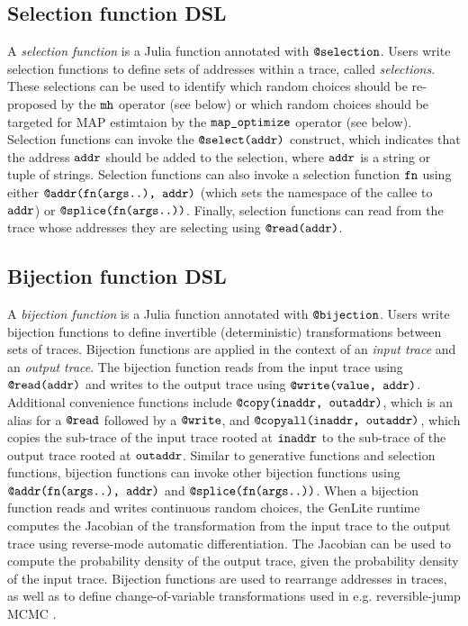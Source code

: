 \subsection{Selection function DSL}
A \emph{selection function} is a Julia function annotated with $\mbox{\texttt{@selection}}$.
Users write selection functions to define sets of addresses within a trace, called \emph{selections}.
These selections can be used to identify which random choices should be re-proposed by the $\mbox{\texttt{mh}}$ operator (see below) or which random choices should be targeted for MAP estimtaion by the $\mbox{\texttt{map\_optimize}}$ operator (see below).
Selection functions can invoke the $\mbox{\texttt{@select(addr)}}$ construct, which indicates that the address $\mbox{\texttt{addr}}$ should be added to the selection, where $\mbox{\texttt{addr}}$ is a string or tuple of strings.
Selection functions can also invoke a selection function $\mbox{\texttt{fn}}$ using either $\mbox{\texttt{@addr(fn(args..), addr)}}$ (which sets the namespace of the callee to $\mbox{\texttt{addr}}$) or $\mbox{\texttt{@splice(fn(args..))}}$.
Finally, selection functions can read from the trace whose addresses they are selecting using $\mbox{\texttt{@read(addr)}}$.

\subsection{Bijection function DSL}
A \emph{bijection function} is a Julia function annotated with $\mbox{\texttt{@bijection}}$.
Users write bijection functions to define invertible (deterministic) transformations between sets of traces.
Bijection functions are applied in the context of an \emph{input trace} and an \emph{output trace}.
The bijection function reads from the input trace using $\mbox{\texttt{@read(addr)}}$ and writes to the output trace using $\mbox{\texttt{@write(value, addr)}}$.
Additional convenience functions include $\mbox{\texttt{@copy(inaddr, outaddr)}}$, which is an alias for a $\mbox{\texttt{@read}}$ followed by a $\mbox{\texttt{@write}}$, and $\mbox{\texttt{@copyall(inaddr, outaddr)}}$, which copies the sub-trace of the input trace rooted at $\mbox{\texttt{inaddr}}$ to the sub-trace of the output trace rooted at $\mbox{\texttt{outaddr}}$.
Similar to generative functions and selection functions, bijection functions can invoke other bijection functions using $\mbox{\texttt{@addr(fn(args..), addr)}}$ and $\mbox{\texttt{@splice(fn(args..))}}$.
When a bijection function reads and writes continuous random choices, the GenLite runtime computes the Jacobian of the transformation from the input trace to the output trace using reverse-mode automatic differentiation.
The Jacobian can be used to compute the probability density of the output trace, given the probability density of the input trace.
Bijection functions are used to rearrange addresses in traces, as well as to define change-of-variable transformations used in e.g. reversible-jump MCMC \cite{Green1994}.


